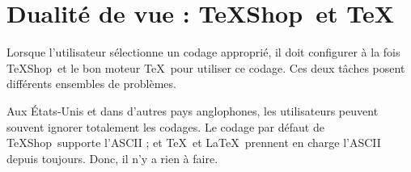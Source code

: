 \documentclass[11pt,french]{article}
\newcommand{\TS}{\textsf{\TeX Shop}}
\newcommand{\acr}[1]{\textsf{#1}}
\newcommand{\cmd}[1]{\textsf{#1}}
\begin{document}
%

%

\section{Dualité de vue : \TS\ et \TeX} 

Lorsque l'utilisateur sélectionne un codage approprié, il doit configurer à la fois \TS\ et le bon moteur \TeX\ pour utiliser ce codage. Ces deux tâches posent différents ensembles de problèmes.

Aux États-Unis et dans d'autres pays anglophones, les utilisateurs peuvent souvent ignorer totalement les codages. Le codage par défaut de \TS\ supporte l'\acr{ASCII} ; et \TeX\ et \LaTeX\ prennent en charge l'\acr{ASCII} depuis toujours. Donc, il n'y a rien à faire.
\end{document}

